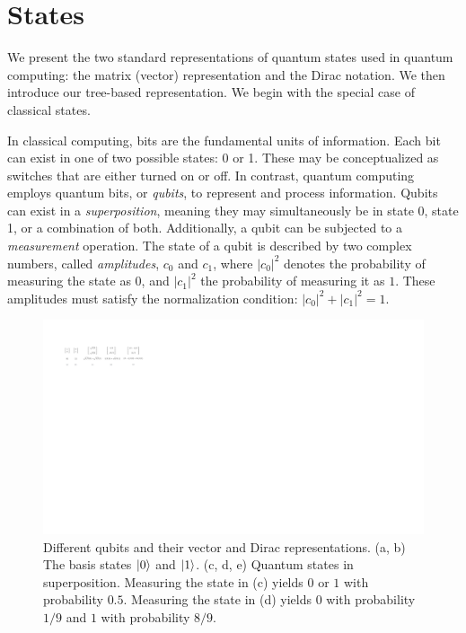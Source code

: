 \section{States} 

We present the two standard representations of quantum states used in quantum computing: the matrix (vector) representation and the Dirac notation.
%
We then introduce our tree-based representation.
%
We begin with the special case of classical states.

In classical computing, bits are the fundamental units of information. 
%
Each bit can exist in one of two possible states: 0 or 1. 
%
These may be conceptualized as switches that are either turned on or off. 
%
In contrast, quantum computing employs quantum bits, or {\it qubits}, to represent and process information. 
%
Qubits can exist in a {\it superposition}, meaning they may simultaneously be in state 0, state 1, or a combination of both. 
%
Additionally, a qubit can be subjected to a {\it measurement} operation. 
%
The state of a qubit is described by two complex numbers, called {\it amplitudes}, $c_0$ and $c_1$, where $|c_0|^2$ denotes the probability of measuring the state as $0$, and $|c_1|^2$ the probability of measuring it as $1$. 
%
These amplitudes must satisfy the normalization condition: $|c_0|^2 + |c_1|^2 = 1$.

\begin{figure}
\includegraphics[scale=0.85]{Figures/States/states}
\caption{Different qubits and their vector and Dirac representations.
(a, b) The basis states $|0\rangle$ and $|1\rangle$.
(c, d, e) Quantum states in superposition.
%
Measuring the state in (c) yields $0$ or $1$ with probability $0.5$.
%
Measuring the state in (d) yields $0$ with probability $1/9$ and $1$ with probability $8/9$.
}
\label{qbit:state:fig}
\end{figure}

